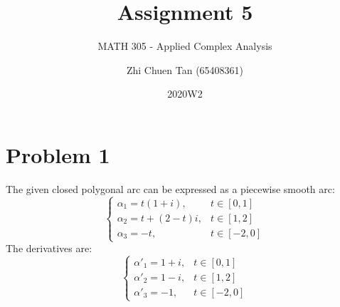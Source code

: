 \documentclass[a4paper, titlepage, DIV=14]{scrartcl}
\title{Assignment 5}
\subtitle{MATH 305 - Applied Complex Analysis}
\author{Zhi Chuen Tan (65408361)}
\date{2020W2}
\begin{document}
    \onehalfspacing
    \hypersetup{pageanchor=false}
    \begin{titlepage}
        \maketitle
        \vfill
        
    \end{titlepage}
    \hypersetup{pageanchor=true}

    \section*{Problem 1}
    The given closed polygonal arc can be expressed as a piecewise smooth arc:
    \[
        \begin{cases}
            \alpha_{1} = t(1+i), & t\in[0,1] \\
            \alpha_{2} = t + (2-t)i, & t\in[1,2] \\
            \alpha_{3} = -t, & t\in[-2,0]
        \end{cases}  
    \]
    The derivatives are:
    \[
        \begin{cases}
            \alpha'_{1} = 1+i, & t\in[0,1] \\
            \alpha'_{2} = 1 - i, & t\in[1,2] \\
            \alpha'_{3} = -1, & t\in[-2,0]
        \end{cases}    
    \]
    
\end{document}
